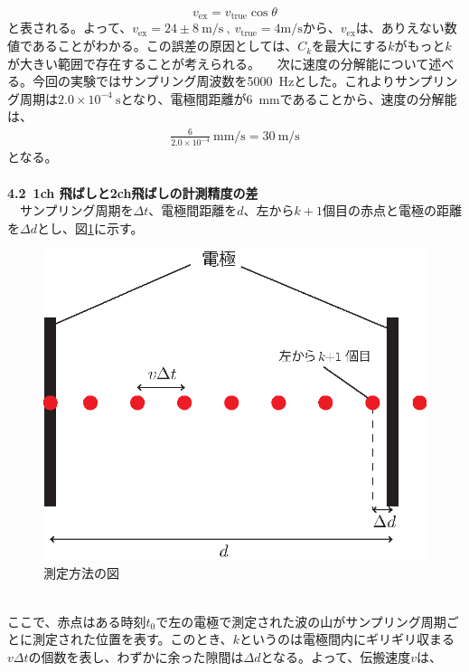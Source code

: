\documentclass[a4paper,10.5pt]{ltjsarticle}
\begin{document}
\begin{equation}
  v_\mathrm{ex}=v_\mathrm{true}\cos{\theta}
\end{equation}
と表される。よって、$v_\mathrm{ex}=24\pm8\ \mathrm{m/s}\ ,\ v_\mathrm{true}=4 \mathrm{m/s}$から、$v_\mathrm{ex}$は、ありえない数値であることがわかる。この誤差の原因としては、$C_k$を最大にする$k$がもっと$k$が大きい範囲で存在することが考えられる。
　次に速度の分解能について述べる。今回の実験ではサンプリング周波数を5000\ Hzとした。これよりサンプリング周期は$2.0\times10^{-4}\ \mathrm{s}$となり、電極間距離が6\ mmであることから、速度の分解能は、
\begin{align}
  \frac{6}{2.0\times10^{-4}}\ \mathrm{mm/s}=30\ \mathrm{m/s}
\end{align}
となる。\\
\\
{\large \bfseries 4.2\ 1ch 飛ばしと2ch飛ばしの計測精度の差}\\
　サンプリング周期を$\Delta t$、電極間距離を$d$、左から$k+1$個目の赤点と電極の距離を$\Delta d$とし、図\ref{measurement}に示す。
\begin{figure}[h]
  \centering
  \includegraphics{figure3.eps}
  \vspace{-30pt}\caption{測定方法の図}
  \label{measurement}
\end{figure}\\
ここで、赤点はある時刻$t_0$で左の電極で測定された波の山がサンプリング周期ごとに測定された位置を表す。このとき、$k$というのは電極間内にギリギリ収まる$v\Delta t$の個数を表し、わずかに余った隙間は$\Delta d$となる。よって、伝搬速度$v$は、
\end{document}
